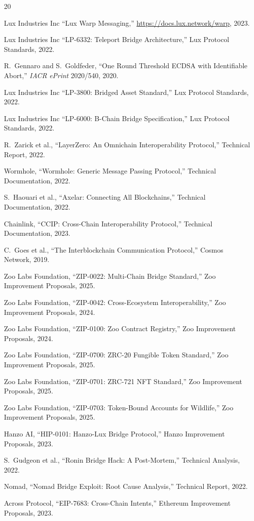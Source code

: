 \documentclass[11pt,letterpaper]{article}
\begin{document}

\begin{thebibliography}{20}

Lux Industries Inc ``Lux Warp Messaging,'' \url{https://docs.lux.network/warp}, 2023.

Lux Industries Inc ``LP-6332: Teleport Bridge Architecture,'' Lux Protocol Standards, 2022.

R.~Gennaro and S.~Goldfeder, ``One Round Threshold ECDSA with Identifiable Abort,'' \textit{IACR ePrint} 2020/540, 2020.

Lux Industries Inc ``LP-3800: Bridged Asset Standard,'' Lux Protocol Standards, 2022.

Lux Industries Inc ``LP-6000: B-Chain Bridge Specification,'' Lux Protocol Standards, 2022.

R.~Zarick et al., ``LayerZero: An Omnichain Interoperability Protocol,'' Technical Report, 2022.

Wormhole, ``Wormhole: Generic Message Passing Protocol,'' Technical Documentation, 2022.

S.~Haouari et al., ``Axelar: Connecting All Blockchains,'' Technical Documentation, 2022.

Chainlink, ``CCIP: Cross-Chain Interoperability Protocol,'' Technical Documentation, 2023.

C.~Goes et al., ``The Interblockchain Communication Protocol,'' Cosmos Network, 2019.

Zoo Labs Foundation, ``ZIP-0022: Multi-Chain Bridge Standard,'' Zoo Improvement Proposals, 2025.

Zoo Labs Foundation, ``ZIP-0042: Cross-Ecosystem Interoperability,'' Zoo Improvement Proposals, 2024.

Zoo Labs Foundation, ``ZIP-0100: Zoo Contract Registry,'' Zoo Improvement Proposals, 2024.

Zoo Labs Foundation, ``ZIP-0700: ZRC-20 Fungible Token Standard,'' Zoo Improvement Proposals, 2025.

Zoo Labs Foundation, ``ZIP-0701: ZRC-721 NFT Standard,'' Zoo Improvement Proposals, 2025.

Zoo Labs Foundation, ``ZIP-0703: Token-Bound Accounts for Wildlife,'' Zoo Improvement Proposals, 2025.

Hanzo AI, ``HIP-0101: Hanzo-Lux Bridge Protocol,'' Hanzo Improvement Proposals, 2023.

S.~Gudgeon et al., ``Ronin Bridge Hack: A Post-Mortem,'' Technical Analysis, 2022.

Nomad, ``Nomad Bridge Exploit: Root Cause Analysis,'' Technical Report, 2022.

Across Protocol, ``EIP-7683: Cross-Chain Intents,'' Ethereum Improvement Proposals, 2023.

\end{thebibliography}
\end{document}
